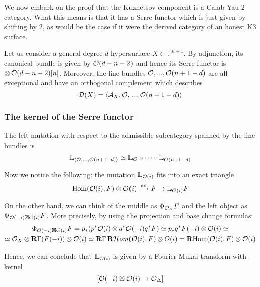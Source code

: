 We now embark on the proof that the Kuznetsov component is a Calab-Yau 2 category. What this means is that it has a Serre functor which is just given by shifting by $2$, as would be the case if it were the derived category of an honest K3 surface.

    

Let us consider a general degree $d$ hypersurface $X \subset \mathbb{P}^{n+1}$. By adjunction, its canonical bundle is given by $\mathcal{O}(d-n-2)$ and hence its Serre functor is $\otimes \,\mathcal{O}(d-n-2)[n] $. Moreover, the line bundles $\mathcal{O},...,\mathcal{O}(n+1-d)$ are all exceptional and have an orthogonal complement which describes $$\mathcal{D}(X)=\langle \mathcal{A}_X,\mathcal{O},...,\mathcal{O}(n+1-d) \rangle $$

\subsubsection{The kernel of the Serre functor}

The left mutation with respect to the admissible subcategory spanned by the line bundles is $$\mathbb{L}_{\langle \mathcal{O}, \dots, \mathcal{O}(n+1-d) \rangle}\simeq \mathbb{L}_{\mathcal{O}} \circ \dots \circ \mathbb{L}_{\mathcal{O}(n+1-d)}$$

Now we notice the following: the mutation $\mathbb{L}_{\mathcal{O}(i)}$ fits into an exact triangle $$\operatorname{Hom}(\mathcal{O}(i), F)\otimes \mathcal{O}(i) \xrightarrow{ev} F \rightarrow \mathbb{L}_{\mathcal{O}(i)} F$$

On the other hand, we can think of the middle as $\Phi_{\mathcal{O}_\Delta}F$ and the left object as $\Phi_{\mathcal{O}(-i)\boxtimes \mathcal{O}(i)}F$. More precisely, by using the projection and base change formulas:
\begin{gather*}
    \Phi_{\mathcal{O}(-i)\boxtimes \mathcal{O}(i)}F=p_* (p^*\mathcal{O}(i)\otimes q^* \mathcal{O}(-i)q^*F)\simeq p_* q^* F(-i)\otimes \mathcal{O}(i)\simeq\\
    \simeq \mathcal{O}_X \otimes \operatorname{\mathbf{R}\Gamma} (F(-i))\otimes \mathcal{O}(i)\simeq \operatorname{\mathbf{R}\Gamma} \operatorname{\mathbf{R}\mathcal{H}\mathit{om}}(\mathcal{O}(i),F) \otimes O(i)=\operatorname{\mathbf{R} Hom}(\mathcal{O}(i),F) \otimes \mathcal{O}(i)
\end{gather*}

Hence, we can conclude that $\mathbb{L}_{\mathcal{O}(i)}$ is given by a Fourier-Mukai transform with kernel $$[\mathcal{O}(-i)\boxtimes \mathcal{O}(i)\rightarrow \mathcal{O}_\Delta]$$

